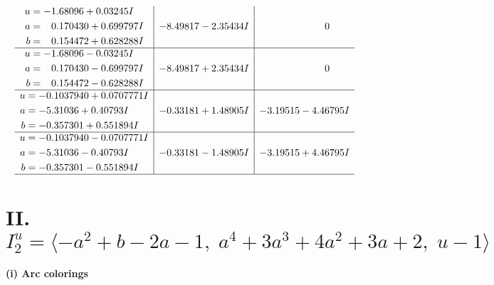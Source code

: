\documentclass[1p]{elsarticle_modified}
\theoremstyle{definition}
\begin{document}
$$\begin{array}{c|c|c}
\begin{aligned}
u &= -1.68096 + 0.03245 I \\
a &= \phantom{-}0.170430 + 0.699797 I \\
b &= \phantom{-}0.154472 + 0.628288 I\end{aligned}
 & -8.49817 - 2.35434 I & \phantom{-0.000000 } 0 \\ \hline\begin{aligned}
u &= -1.68096 - 0.03245 I \\
a &= \phantom{-}0.170430 - 0.699797 I \\
b &= \phantom{-}0.154472 - 0.628288 I\end{aligned}
 & -8.49817 + 2.35434 I & \phantom{-0.000000 } 0 \\ \hline\begin{aligned}
u &= -0.1037940 + 0.0707771 I \\
a &= -5.31036 + 0.40793 I \\
b &= -0.357301 + 0.551894 I\end{aligned}
 & -0.33181 + 1.48905 I & -3.19515 - 4.46795 I \\ \hline\begin{aligned}
u &= -0.1037940 - 0.0707771 I \\
a &= -5.31036 - 0.40793 I \\
b &= -0.357301 - 0.551894 I\end{aligned}
 & -0.33181 - 1.48905 I & -3.19515 + 4.46795 I\\
 \hline 
 \end{array}$$\newpage\newpage\renewcommand{\arraystretch}{1}
\centering \section*{II. $I^u_{2}= \langle - a^2+b-2 a-1,\;a^4+3 a^3+4 a^2+3 a+2,\;u-1 \rangle$}
\flushleft \textbf{(i) Arc colorings}\\
\end{document}
